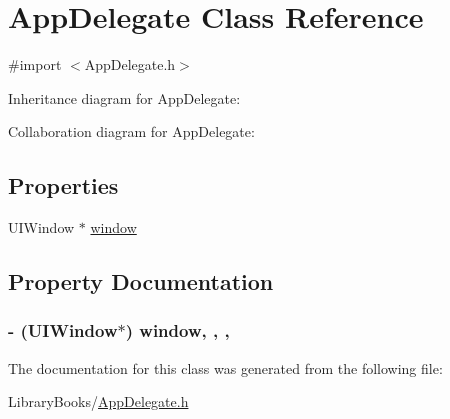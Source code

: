 \hypertarget{interface_app_delegate}{}\section{App\+Delegate Class Reference}
\label{interface_app_delegate}


{\ttfamily \#import $<$App\+Delegate.\+h$>$}



Inheritance diagram for App\+Delegate\+:


Collaboration diagram for App\+Delegate\+:
\subsection*{Properties}
\begin{DoxyCompactItemize}
\item 
U\+I\+Window $\ast$ \hyperlink{interface_app_delegate_acf48ac24125e688cac1a85445cd7fac2}{window}
\end{DoxyCompactItemize}


\subsection{Property Documentation}
\hypertarget{interface_app_delegate_acf48ac24125e688cac1a85445cd7fac2}{}
\subsubsection[{window}]{\setlength{\rightskip}{0pt plus 5cm}-\/ (U\+I\+Window$\ast$) window\hspace{0.3cm}{\ttfamily [read]}, {\ttfamily [write]}, {\ttfamily [nonatomic]}, {\ttfamily [strong]}}\label{interface_app_delegate_acf48ac24125e688cac1a85445cd7fac2}


The documentation for this class was generated from the following file\+:\begin{DoxyCompactItemize}
\item 
Library\+Books/\hyperlink{_app_delegate_8h}{App\+Delegate.\+h}\end{DoxyCompactItemize}
